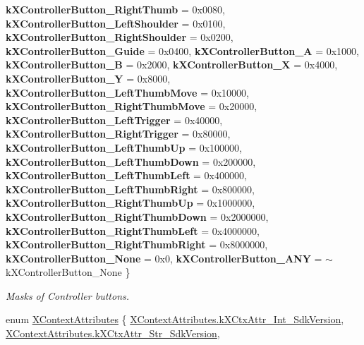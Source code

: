 \begin{DoxyCompactItemize}
{\bfseries k\+X\+Controller\+Button\+\_\+\+Right\+Thumb} = 0x0080, 
\newline
{\bfseries k\+X\+Controller\+Button\+\_\+\+Left\+Shoulder} = 0x0100, 
{\bfseries k\+X\+Controller\+Button\+\_\+\+Right\+Shoulder} = 0x0200, 
{\bfseries k\+X\+Controller\+Button\+\_\+\+Guide} = 0x0400, 
{\bfseries k\+X\+Controller\+Button\+\_\+A} = 0x1000, 
\newline
{\bfseries k\+X\+Controller\+Button\+\_\+B} = 0x2000, 
{\bfseries k\+X\+Controller\+Button\+\_\+X} = 0x4000, 
{\bfseries k\+X\+Controller\+Button\+\_\+Y} = 0x8000, 
{\bfseries k\+X\+Controller\+Button\+\_\+\+Left\+Thumb\+Move} = 0x10000, 
\newline
{\bfseries k\+X\+Controller\+Button\+\_\+\+Right\+Thumb\+Move} = 0x20000, 
{\bfseries k\+X\+Controller\+Button\+\_\+\+Left\+Trigger} = 0x40000, 
{\bfseries k\+X\+Controller\+Button\+\_\+\+Right\+Trigger} = 0x80000, 
{\bfseries k\+X\+Controller\+Button\+\_\+\+Left\+Thumb\+Up} = 0x100000, 
\newline
{\bfseries k\+X\+Controller\+Button\+\_\+\+Left\+Thumb\+Down} = 0x200000, 
{\bfseries k\+X\+Controller\+Button\+\_\+\+Left\+Thumb\+Left} = 0x400000, 
{\bfseries k\+X\+Controller\+Button\+\_\+\+Left\+Thumb\+Right} = 0x800000, 
{\bfseries k\+X\+Controller\+Button\+\_\+\+Right\+Thumb\+Up} = 0x1000000, 
\newline
{\bfseries k\+X\+Controller\+Button\+\_\+\+Right\+Thumb\+Down} = 0x2000000, 
{\bfseries k\+X\+Controller\+Button\+\_\+\+Right\+Thumb\+Left} = 0x4000000, 
{\bfseries k\+X\+Controller\+Button\+\_\+\+Right\+Thumb\+Right} = 0x8000000, 
{\bfseries k\+X\+Controller\+Button\+\_\+\+None} = 0x0, 
\newline
{\bfseries k\+X\+Controller\+Button\+\_\+\+A\+NY} = $\sim$k\+X\+Controller\+Button\+\_\+\+None
 \}
\begin{DoxyCompactList}\small\item\em Masks of Controller buttons. \end{DoxyCompactList}\item 
enum \mbox{\hyperlink{class_ximmerse_1_1_input_system_1_1_x_device_plugin_aabfeabd1179f1fa965e3edc6f8b8d415}{X\+Context\+Attributes}} \{ \mbox{\hyperlink{class_ximmerse_1_1_input_system_1_1_x_device_plugin_aabfeabd1179f1fa965e3edc6f8b8d415afc49054c2c089e77c8e1bb799d5b30d1}{X\+Context\+Attributes.\+k\+X\+Ctx\+Attr\+\_\+\+Int\+\_\+\+Sdk\+Version}}, 
\mbox{\hyperlink{class_ximmerse_1_1_input_system_1_1_x_device_plugin_aabfeabd1179f1fa965e3edc6f8b8d415a8040fcb6b1b71175430cc98f134c904b}{X\+Context\+Attributes.\+k\+X\+Ctx\+Attr\+\_\+\+Str\+\_\+\+Sdk\+Version}}, 

\end{DoxyCompactItemize}
